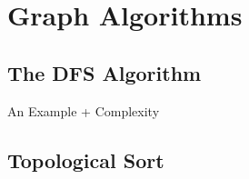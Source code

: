
\section{Graph Algorithms}
\label{appendix:AppendixA}





\subsection{The DFS Algorithm}

An Example + Complexity





\subsection{Topological Sort}





